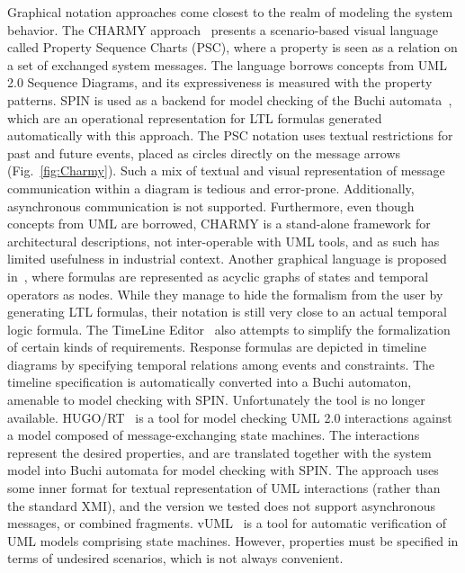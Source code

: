 \documentclass[letter]{llncs}
\begin{document}
Graphical notation approaches come closest to the realm of modeling the system behavior.
The CHARMY approach~\cite{Autili:2007:GSS:1290845.1290859} presents a scenario-based visual language called 
Property Sequence Charts (PSC), where a property is seen as a relation on a set of exchanged
system messages. The language borrows concepts from UML 2.0 Sequence Diagrams, and its expressiveness
is measured with the property patterns. SPIN is used as a backend for model checking of
the Buchi automata~\cite{Giannakopoulou:2001:AVT:872023.872506}, which are 
an operational representation for LTL formulas generated automatically with this approach.
The PSC notation uses textual restrictions for past and future events, placed as circles directly on the message arrows (Fig.~\ref{fig:Charmy}).
Such a mix of textual and visual representation of message communication
within a diagram is tedious and error-prone. Additionally, asynchronous communication is not supported.
Furthermore, even though concepts from UML are borrowed, CHARMY is a stand-alone framework for architectural descriptions,
not inter-operable with UML tools, and as such has limited usefulness in industrial context.
Another graphical language is proposed in~\cite{Lee97agraphical}, where formulas
are represented as acyclic graphs of states and temporal operators as nodes.
While they manage to hide the formalism from the user by generating LTL formulas, 
their notation is still very close to an actual temporal logic formula.
The TimeLine Editor~\cite{Smith:2001:ECG:882477.883639} also attempts to simplify the formalization of certain
kinds of requirements. Response formulas are depicted in timeline diagrams by specifying temporal relations among events and constraints. 
The timeline specification is automatically converted into a Buchi automaton, amenable to model checking with SPIN.
Unfortunately the tool is no longer available.
HUGO/RT~\cite{Knapp:2006:MCU:1762828.1762836} is a tool for model checking UML 2.0 interactions 
against a model composed of message-exchanging state machines. The interactions represent the desired properties,
and are translated together with the system model into Buchi automata for model checking with SPIN.
The approach uses some inner format for textual representation of UML interactions (rather than
the standard XMI), and the version we tested does not support asynchronous messages, or combined fragments.
vUML~\cite{Lilius99vuml:a} is a tool for automatic verification of UML models comprising state machines.
However, properties must be specified in terms of undesired scenarios, which is not always convenient.
\end{document}
